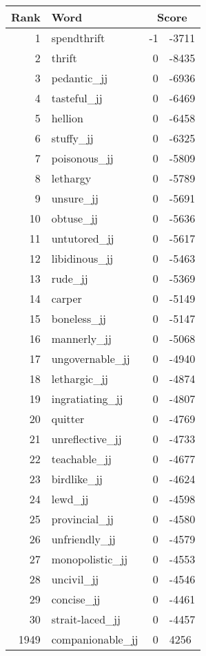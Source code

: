 \begin{longtable}[!htbp]{| rlr@{.}l |}
    \hline
    \textbf{Rank} & \textbf{Word} & \multicolumn{2}{c|}{\textbf{Score}} \\
    \hline
    \endhead
    1 & spendthrift & -1 & -3711 \\
    2 & thrift & 0 & -8435 \\
    3 & pedantic\_jj & 0 & -6936 \\
    4 & tasteful\_jj & 0 & -6469 \\
    5 & hellion & 0 & -6458 \\
    6 & stuffy\_jj & 0 & -6325 \\
    7 & poisonous\_jj & 0 & -5809 \\
    8 & lethargy & 0 & -5789 \\
    9 & unsure\_jj & 0 & -5691 \\
    10 & obtuse\_jj & 0 & -5636 \\
    11 & untutored\_jj & 0 & -5617 \\
    12 & libidinous\_jj & 0 & -5463 \\
    13 & rude\_jj & 0 & -5369 \\
    14 & carper & 0 & -5149 \\
    15 & boneless\_jj & 0 & -5147 \\
    16 & mannerly\_jj & 0 & -5068 \\
    17 & ungovernable\_jj & 0 & -4940 \\
    18 & lethargic\_jj & 0 & -4874 \\
    19 & ingratiating\_jj & 0 & -4807 \\
    20 & quitter & 0 & -4769 \\
    21 & unreflective\_jj & 0 & -4733 \\
    22 & teachable\_jj & 0 & -4677 \\
    23 & birdlike\_jj & 0 & -4624 \\
    24 & lewd\_jj & 0 & -4598 \\
    25 & provincial\_jj & 0 & -4580 \\
    26 & unfriendly\_jj & 0 & -4579 \\
    27 & monopolistic\_jj & 0 & -4553 \\
    28 & uncivil\_jj & 0 & -4546 \\
    29 & concise\_jj & 0 & -4461 \\
    30 & strait-laced\_jj & 0 & -4457 \\
    1949 & companionable\_jj & 0 & 4256 \\

\end{longtable}
